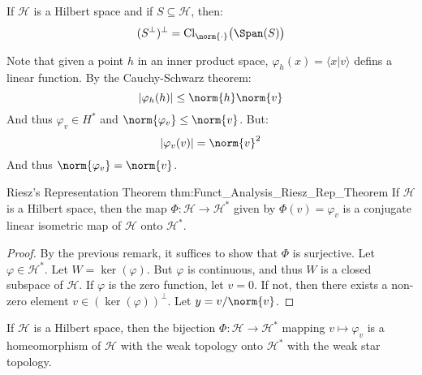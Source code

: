         \begin{theorem}
            If $\mathcal{H}$ is a Hilbert space and if
            $S\subseteq\mathcal{H}$, then:
            \begin{equation}
                (S^{\perp})^{\perp}
                =\mathrm{Cl}_{\norm{\cdot}}\big(\Span(S)\big)
            \end{equation}
        \end{theorem}
        Note that given a point $h$ in an inner product space,
        $\varphi_{h}(x)=\langle{x|v}\rangle$ defins a linear
        function. By the Cauchy-Schwarz theorem:
        \begin{equation}
            |\varphi_{h}(h)|\leq\norm{h}\norm{v}
        \end{equation}
        And thus $\varphi_{v}\in{H}^{*}$ and
        $\norm{\varphi_{v}}\leq\norm{v}$. But:
        \begin{equation}
            |\varphi_{v}(v)|=\norm{v}^{2}
        \end{equation}
        And thus $\norm{\varphi_{v}}=\norm{v}$.
        \begin{ltheorem}{Riesz's Representation Theorem}
              {thm:Funct_Analysis_Riesz_Rep_Theorem}
            If $\mathcal{H}$ is a Hilbert space, then the
            map $\Phi:\mathcal{H}\rightarrow\mathcal{H}^{*}$
            given by $\Phi(v)=\varphi_{v}$ is a conjugate
            linear isometric map of $\mathcal{H}$ onto
            $\mathcal{H}^{*}$.
        \end{ltheorem}
        \begin{proof}
            By the previous remark, it suffices to show that
            $\Phi$ is surjective. Let $\varphi\in\mathcal{H}^{*}$.
            Let $W=\ker(\varphi)$. But $\varphi$ is continuous,
            and thus $W$ is a closed subspace of $\mathcal{H}$.
            If $\varphi$ is the zero function, let $v=0$. If not,
            then there exists a non-zero element
            $v\in(\ker(\varphi))^{\perp}$. Let
            $y=v/\norm{v}$.
        \end{proof}
        \begin{theorem}
            If $\mathcal{H}$ is a Hilbert space, then the
            bijection $\Phi:\mathcal{H}\rightarrow\mathcal{H}^{*}$
            mapping $v\mapsto\varphi_{v}$ is a homeomorphism
            of $\mathcal{H}$ with the weak topology onto
            $\mathcal{H}^{*}$ with the weak star topology.
        \end{theorem}
